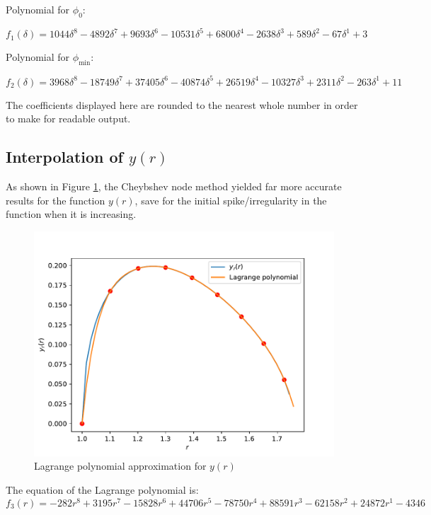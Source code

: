 Polynomial for $\phi_0$:

\begin{equation}
    f_1(\delta)=1044\delta^{8}-4892\delta^{7}+9693\delta^{6}-10531\delta^{5}+6800\delta^{4}-2638\delta^{3}+589\delta^{2}-67\delta^{1}+3
\end{equation}

Polynomial for $\phi_\mathrm{min}$:

\begin{equation}
    f_2(\delta)=3968\delta^{8}-18749\delta^{7}+37405\delta^{6}-40874\delta^{5}+26519\delta^{4}-10327\delta^{3}+2311\delta^{2}-263\delta^{1}+11
\end{equation}

The coefficients displayed here are rounded to the nearest whole number in order to make for readable output.

\subsection{Interpolation of \texorpdfstring{$y(r)$}{}}

As shown in Figure \ref{yrpoly}, the Cheybshev node method yielded far more accurate results for the function $y(r)$, save for the initial spike/irregularity in the function when it is increasing.

\begin{figure}[H]
    \centering
    \includegraphics[scale=0.8]{plots/yr_poly.pdf}
    \caption{Lagrange polynomial approximation for $y(r)$}\label{yrpoly}
\end{figure}

The equation of the Lagrange polynomial is:
\begin{equation}
    f_3(r)=-282r^{8}+3195r^{7}-15828r^{6}+44706r^{5}-78750r^{4}+88591r^{3}-62158r^{2}+24872r^{1}-4346
\end{equation}

